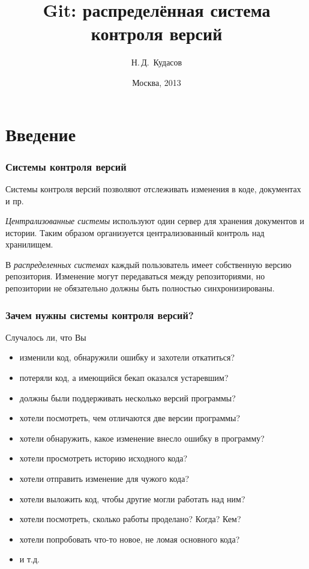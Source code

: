\documentclass{beamer}
\begin{document}
\title[]{Git: распределённая система контроля версий}
\author{Н.\,Д.~Кудасов}
\date{Москва, 2013}

\begin{frame}
\addtocounter{framenumber}{-1}
\maketitle
\end{frame}

\section{Введение}

\begin{frame}
  \frametitle{Системы контроля версий}
  Системы контроля версий позволяют отслеживать изменения в коде, документах и пр.

  {\it Централизованные системы} используют один сервер для хранения документов и истории.
  Таким образом организуется централизованный контроль над хранилищем.

  В {\it распределенных системах} каждый пользователь имеет собственную версию репозитория.
  Изменение могут передаваться между репозиториями, но репозитории не обязательно должны быть
  полностью синхронизированы.
\end{frame}

\begin{frame}
  \frametitle{Зачем нужны системы контроля версий?}
  Случалось ли, что Вы
  \begin{itemize}
    \item изменили код, обнаружили ошибку и захотели откатиться?
    \item потеряли код, а имеющийся бекап оказался устаревшим?
    \item должны были поддерживать несколько версий программы?
    \item хотели посмотреть, чем отличаются две версии программы?
    \item хотели обнаружить, какое изменение внесло ошибку в программу?
    \item хотели просмотреть историю исходного кода?
    \item хотели отправить изменение для чужого кода?
    \item хотели выложить код, чтобы другие могли работать над ним?
    \item хотели посмотреть, сколько работы проделано? Когда? Кем?
    \item хотели попробовать что-то новое, не ломая основного кода?
    \item и т.д.
  \end{itemize}
\end{frame}
\end{document}
